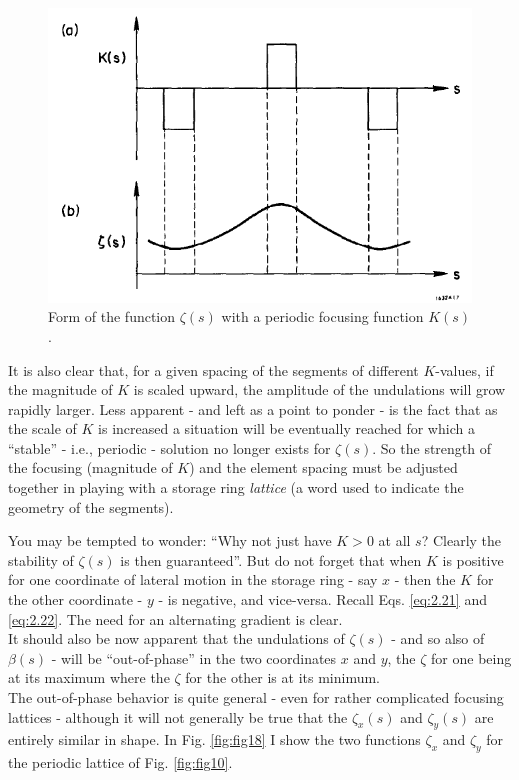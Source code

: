 \begin{figure}[!htb]
	\centering
	\includegraphics[width=0.8\linewidth]{./Figuras/fig17.jpeg}
	\caption{Form of the function $\zeta(s)$ with a periodic focusing function $K(s)$.}
	\label{fig:fig17}
\end{figure}

It is also clear that, for a given spacing of the segments of different $K$-values, if the magnitude of $K$ is scaled upward, the amplitude of the undulations will grow rapidly larger. Less apparent - and left as a point to ponder - is the fact that as the scale of $K$ is increased a situation will be eventually reached for which a ``stable'' - i.e., periodic - solution no longer exists for $\zeta(s)$. So the strength of the focusing (magnitude of $K$) and the element spacing must be adjusted together in playing with a storage ring \emph{lattice} (a word used to indicate the geometry of the segments).

You may be tempted to wonder: ``Why not just have $K > 0$ at all $s$? Clearly the stability of $\zeta(s)$ is then guaranteed''. But do not forget that when $K$ is positive for one coordinate
 of lateral motion in the storage ring - say $x$ - then the $K$ for the other coordinate - $y$ - is negative, and vice-versa. Recall Eqs. \eqref{eq:2.21} and \eqref{eq:2.22}. The need for an alternating gradient is clear.\\
It should also be now apparent that the undulations of $\zeta(s)$ - and so also of $\beta(s)$ - will be “out-of-phase” in the two coordinates $x$ and $y$, the $\zeta$ for one being at
its maximum where the $\zeta$ for the other is at its minimum.\\
The out-of-phase behavior is quite general - even for rather complicated focusing lattices - although it will not generally be true that the $\zeta_x(s)$ and $\zeta_y(s)$ are entirely
 similar in shape. In Fig. \ref{fig:fig18} I show the two functions $\zeta_x$ and $\zeta_y$ for the periodic lattice of Fig. \ref{fig:fig10}.

